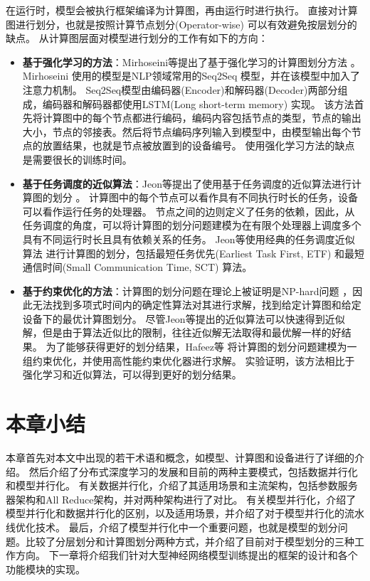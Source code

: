 在运行时，模型会被执行框架编译为计算图，再由运行时进行执行。
直接对计算图进行划分，也就是按照计算节点划分(Operator-wise) 可以有效避免按层划分的缺点。
从计算图层面对模型进行划分的工作有如下的方向：
\begin{itemize}
	\item \textbf{基于强化学习的方法}：Mirhoseini等提出了基于强化学习的计算图划分方法 。
	Mirhoseini 使用的模型是NLP领域常用的Seq2Seq  模型，并在该模型中加入了注意力机制。
	Seq2Seq模型由编码器(Encoder)和解码器(Decoder)两部分组成，编码器和解码器都使用LSTM(Long short-term memory)  实现。
	该方法首先将计算图中的每个节点都进行编码，编码内容包括节点的类型，节点的输出大小，节点的邻接表。然后将节点编码序列输入到模型中，由模型输出每个节点的放置结果，也就是节点被放置到的设备编号。
	使用强化学习方法的缺点是需要很长的训练时间。
	\item \textbf{基于任务调度的近似算法}：Jeon等提出了使用基于任务调度的近似算法进行计算图的划分 。
	计算图中的每个节点可以看作具有不同执行时长的任务，设备可以看作运行任务的处理器。
	节点之间的边则定义了任务的依赖，因此，从任务调度的角度，可以将计算图的划分问题建模为在有限个处理器上调度多个具有不同运行时长且具有依赖关系的任务。
	Jeon等使用经典的任务调度近似算法  进行计算图的划分，包括最短任务优先(Earliest Task First, ETF) 和最短通信时间(Small Communication Time, SCT) 算法。
	\item \textbf{基于约束优化的方法}：计算图的划分问题在理论上被证明是NP-hard问题  ，因此无法找到多项式时间内的确定性算法对其进行求解，找到给定计算图和给定设备下的最优计算图划分。
	尽管Jeon等提出的近似算法可以快速得到近似解，但是由于算法近似比的限制，往往近似解无法取得和最优解一样的好结果。
	为了能够获得更好的划分结果，Hafeez等  将计算图的划分问题建模为一组约束优化，并使用高性能约束优化器进行求解。
	实验证明，该方法相比于强化学习和近似算法，可以得到更好的划分结果。

\end{itemize}

\section{本章小结}

本章首先对本文中出现的若干术语和概念，如模型、计算图和设备进行了详细的介绍。
然后介绍了分布式深度学习的发展和目前的两种主要模式，包括数据并行化和模型并行化。
有关数据并行化，介绍了其适用场景和主流架构，包括参数服务器架构和All Reduce架构，并对两种架构进行了对比。
有关模型并行化，介绍了模型并行化和数据并行化的区别，以及适用场景，并介绍了对于模型并行化的流水线优化技术。
最后，介绍了模型并行化中一个重要问题，也就是模型的划分问题。比较了分层划分和计算图划分两种方式，并介绍了目前对于模型划分的三种工作方向。
下一章将介绍我们针对大型神经网络模型训练提出的\sys{}框架的设计和各个功能模块的实现。 